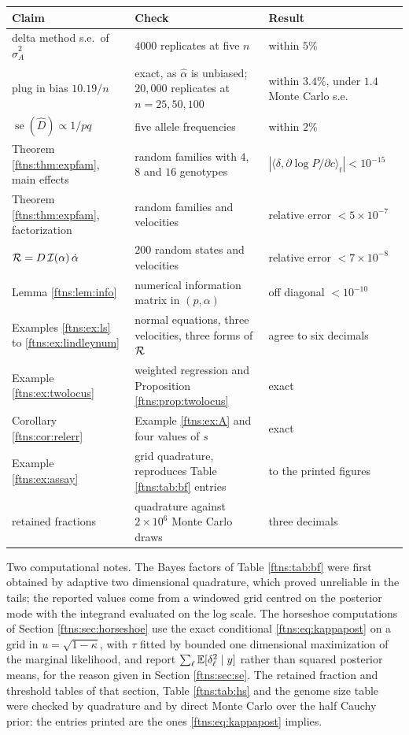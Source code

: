 \begin{center}
\begin{tabularx}{\textwidth}{l>{\raggedright\arraybackslash}X>{\raggedright\arraybackslash}X}
\toprule
Claim & Check & Result \\
\midrule
delta method s.e.\ of $\hat\sigma^2_A$ & $4000$ replicates at five $n$ & within $5\%$ \\
plug in bias $10.19/n$ & exact, as $\hat\alpha$ is unbiased; $20{,}000$ replicates at $n=25,50,100$ & within $3.4\%$, under $1.4$ Monte Carlo s.e. \\
$\operatorname{se}(\hat D)\propto1/pq$ & five allele frequencies & within $2\%$ \\
Theorem \ref{ftns:thm:expfam}, main effects & random families with $4$, $8$ and $16$ genotypes & $|\langle\delta,\partial\log P/\partial c\rangle_t|<10^{-15}$ \\
Theorem \ref{ftns:thm:expfam}, factorization & random families and velocities & relative error $<5\times10^{-7}$ \\
$\mathcal{R}=D\,\mathcal{I}(\alpha)\,\dot\alpha$ & $200$ random states and velocities & relative error $<7\times10^{-8}$ \\
Lemma \ref{ftns:lem:info} & numerical information matrix in $(p,\alpha)$ & off diagonal $<10^{-10}$ \\
Examples \ref{ftns:ex:ls} to \ref{ftns:ex:lindleynum} & normal equations, three velocities, three forms of $\mathcal{R}$ & agree to six decimals \\
Example \ref{ftns:ex:twolocus} & weighted regression and Proposition \ref{ftns:prop:twolocus} & exact \\
Corollary \ref{ftns:cor:relerr} & Example \ref{ftns:ex:A} and four values of $s$ & exact \\
Example \ref{ftns:ex:assay} & grid quadrature, reproduces Table \ref{ftns:tab:bf} entries & to the printed figures \\
retained fractions & quadrature against $2\times10^6$ Monte Carlo draws & three decimals \\
\bottomrule
\end{tabularx}
\end{center}

Two computational notes. The Bayes factors of Table \ref{ftns:tab:bf} were first obtained by adaptive
two dimensional quadrature, which proved unreliable in the tails; the reported values come from a
windowed grid centred on the posterior mode with the integrand evaluated on the log scale. The
horseshoe computations of Section \ref{ftns:sec:horseshoe} use the exact conditional
\eqref{ftns:eq:kappapost} on a grid in $u=\sqrt{1-\kappa}$, with $\tau$ fitted by bounded one
dimensional maximization of the marginal likelihood, and report $\sum_\ell\mathbb{E}[\delta^2_\ell\mid y]$
rather than squared posterior means, for the reason given in Section \ref{ftns:sec:se}. The retained fraction and threshold tables of that section, Table \ref{ftns:tab:hs} and the genome size table
were checked by quadrature and by direct Monte Carlo over the half Cauchy prior: the entries printed
are the ones \eqref{ftns:eq:kappapost} implies.

